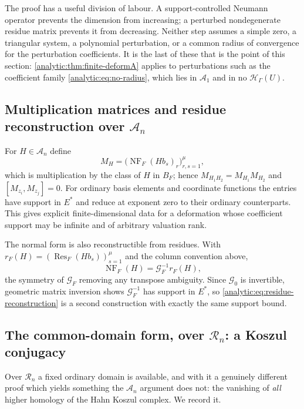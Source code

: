 \documentclass[11pt,letterpaper]{article}
\theoremstyle{definition}
\theoremstyle{remark}
\newcommand{\A}{\mathscr A}
\newcommand{\RR}{\mathscr R}
\newcommand{\HH}{\mathcal H}
\newcommand{\Res}{\operatorname{Res}}
\newcommand{\NF}{\operatorname{NF}}
\numberwithin{equation}{section}
\begin{document}
The proof has a useful division of labour. A support-controlled Neumann
operator prevents the dimension from increasing; a perturbed nondegenerate
residue matrix prevents it from decreasing. Neither step assumes a simple
zero, a triangular system, a polynomial perturbation, or a common radius of
convergence for the perturbation coefficients. It is the last of these that
is the point of this section: \cref{analytic:thm:finite-deformA} applies to
perturbations such as the coefficient family \eqref{analytic:eq:no-radius},
which lies in $\A_1$ and in no $\HH_\Gamma(U)$.

\subsection{Multiplication matrices and residue reconstruction over $\A_n$}
\label{analytic:subsec:matricesA}
For $H\in\A_n$ define
\begin{equation}\label{analytic:eq:multiplication-matrix}
 M_H=\bigl(\NF_F(Hb_s)_r\bigr)_{r,s=1}^\mu ,
\end{equation}
which is multiplication by the class of $H$ in $B_F$; hence
$M_{H_1H_2}=M_{H_1}M_{H_2}$ and $[M_{z_i},M_{z_j}]=0$. For ordinary basis
elements and coordinate functions the entries have support in $E^*$ and
reduce at exponent zero to their ordinary counterparts. This gives explicit
finite-dimensional data for a deformation whose coefficient support may be
infinite and of arbitrary valuation rank.

The normal form is also reconstructible from residues. With
$r_F(H)=(\Res_F(Hb_s))_{s=1}^\mu$ and the column convention above,
\begin{equation}\label{analytic:eq:residue-reconstruction}
 \NF_F(H)=\mathcal G_F^{-1}r_F(H),
\end{equation}
the symmetry of $\mathcal G_F$ removing any transpose ambiguity. Since
$\mathcal G_0$ is invertible, geometric matrix inversion shows
$\mathcal G_F^{-1}$ has support in $E^*$, so
\eqref{analytic:eq:residue-reconstruction} is a second construction with
exactly the same support bound.

\subsection{The common-domain form, over $\RR_n$: a Koszul conjugacy}
\label{analytic:subsec:deformR}
Over $\RR_n$ a fixed ordinary domain is available, and with it a genuinely
different proof which yields something the $\A_n$ argument does not: the
vanishing of \emph{all} higher homology of the Hahn Koszul complex. We
record it.
\end{document}
